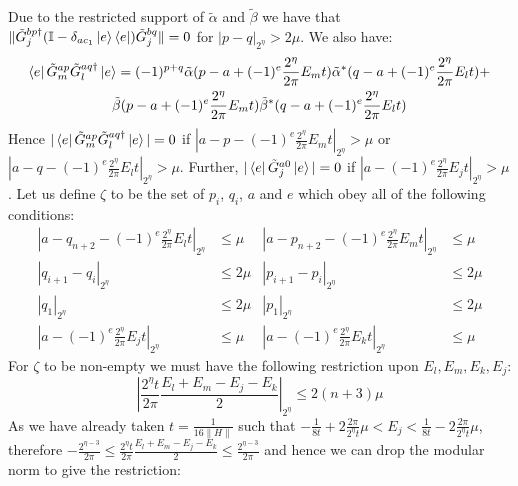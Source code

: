 \documentclass[aps,floatfix,10pt,amssymb,amsfont,amsmath,superscriptaddress,float,nofootinbib,longbibliography,nobalancelastpage,twocolumn]{revtex4-2}
\begin{document}
\begin{widetext}
Due to the restricted support of $\tilde \alpha$ and $\tilde \beta$ we have that $\|\tilde G^{bp\dagger}_{j}(\mathbb{I} - \delta_{ac_1}\ket{e}\bra{e})\tilde G^{bq}_{j}\| = 0$ for $|p-q|_{2^{\eta}} > 2\mu$. We also have:
\begin{multline}
    \bra{e}\tilde G^{ap}_m\tilde G^{aq\dagger}_l\ket{e} = (-1)^{p+q}\tilde \alpha(p - a + (-1)^e\frac{2^{\eta}}{2\pi}E_{m}t)\tilde  \alpha^*(q - a + (-1)^e\frac{2^{\eta}}{2\pi}E_{l}t) +\\ \tilde \beta(p - a + (-1)^e\frac{2^{\eta}}{2\pi}E_{m}t)\tilde  \beta^*(q - a + (-1)^e\frac{2^{\eta}}{2\pi}E_{l}t)
\end{multline}
Hence $|\bra{e}\tilde G^{ap}_m\tilde G^{aq\dagger}_l\ket{e}| = 0$ if $|a-p-(-1)^e\frac{2^{\eta}}{2\pi}E_{m}t|_{2^\eta} > \mu$ or $|a-q-(-1)^e\frac{2^{\eta}}{2\pi}E_{l}t|_{2^\eta} > \mu$. Further, $|\bra{e}\tilde G^{a0}_j \ket{e}| = 0$ if $|a-(-1)^e\frac{2^{\eta}}{2\pi}E_{j}t|_{2^\eta} > \mu$. Let us define $\zeta$ to be the set of $p_i$, $q_i$, $a$ and $e$ which obey all of the following conditions:
\begin{equation}
\begin{aligned}
    |a-q_{n+2}-(-1)^e\frac{2^{\eta}}{2\pi}E_lt|_{2^{\eta}} &\leq \mu  &|a-p_{n+2}-(-1)^e\frac{2^{\eta}}{2\pi}E_mt|_{2^{\eta}} &\leq \mu\\
    |q_{i+1}-q_i|_{2^{\eta}} &\leq 2\mu  &|p_{i+1}-p_i|_{2^{\eta}} &\leq 2\mu\\
    |q_1|_{2^{\eta}} &\leq 2\mu  &|p_1|_{2^{\eta}}&\leq 2\mu\\
    |a-(-1)^{e}\frac{2^{\eta}}{2\pi}E_jt|_{2^{\eta}} &\leq \mu   &|a-(-1)^{e}\frac{2^{\eta}}{2\pi}E_kt|_{2^{\eta}}& \leq \mu
\end{aligned}
\end{equation}
For $\zeta$ to be non-empty we must have the following restriction upon $E_l,E_m,E_k, E_j$:
\begin{equation}
    \left|\frac{2^{\eta}t}{2\pi}\frac{E_l+E_m-E_j-E_k}{2}\right|_{2^{\eta}} \leq 2(n+3)\mu
\end{equation}
As we have already taken $t= \frac{1}{16\|H\|}$ such that $-\frac{1}{8t} + 2\frac{2\pi}{2^{\eta}t}\mu < E_j < \frac{1}{8t} - 2\frac{2\pi}{2^{\eta}t}\mu$, therefore $-\frac{2^{\eta-3}}{2\pi}\leq \frac{2^{\eta}t}{2\pi}\frac{E_l+E_m-E_j-E_k}{2} \leq \frac{2^{\eta-3}}{2\pi}$ and hence we can drop the modular norm to give the restriction:
\begin{equation}

\end{equation}
\end{widetext}
\end{document}
